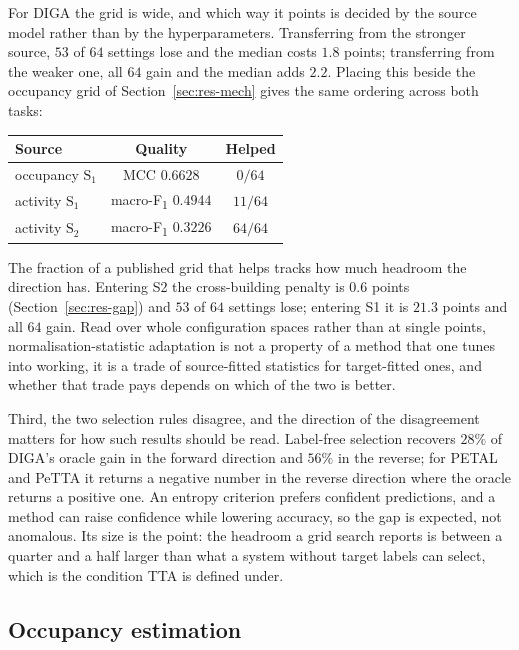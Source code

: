 \documentclass[a4paper,fleqn]{cas-dc}
\newcommand{\macf}{macro-F\textsubscript{1}}
\begin{document}
For DIGA the grid is wide, and which way it points is decided by the source model rather
than by the hyperparameters. Transferring from the stronger source, $53$ of $64$ settings
lose and the median costs $1.8$ points; transferring from the weaker one, all $64$ gain
and the median adds $2.2$. Placing this beside the occupancy grid of
Section~\ref{sec:res-mech} gives the same ordering across both tasks:

\begin{center}\footnotesize
\begin{tabular}{@{}lcc@{}}
\toprule
Source & Quality & Helped \\
\midrule
occupancy $\text{S}_1$ & MCC $0.6628$ & $0/64$ \\
activity $\text{S}_1$  & \macf{} $0.4944$ & $11/64$ \\
activity $\text{S}_2$  & \macf{} $0.3226$ & $64/64$ \\
\bottomrule
\end{tabular}
\end{center}

The fraction of a published grid that helps tracks how much headroom the direction has.
Entering S2 the cross-building penalty is $0.6$ points (Section~\ref{sec:res-gap}) and
$53$ of $64$ settings lose; entering S1 it is $21.3$ points and all $64$ gain. Read over
whole configuration spaces rather than at single points, normalisation-statistic
adaptation is
not a property of a method that one tunes into working, it is a trade of source-fitted
statistics for target-fitted ones, and whether that trade pays depends on which of the two
is better.

Third, the two selection rules disagree, and the direction of the disagreement matters for
how such results should be read. Label-free selection recovers $28\%$ of DIGA's oracle gain
in the forward direction and $56\%$ in the reverse; for PETAL and PeTTA it returns a
negative number in the reverse direction where the oracle returns a positive one. An
entropy criterion prefers confident predictions, and a method can raise confidence while
lowering accuracy, so the gap is expected, not anomalous. Its size is the point: the
headroom a grid search reports is between a quarter and a half larger than what a system
without target labels can select, which is the condition TTA is defined under.

\subsection{Occupancy estimation}
\label{sec:res-oe}
\end{document}
